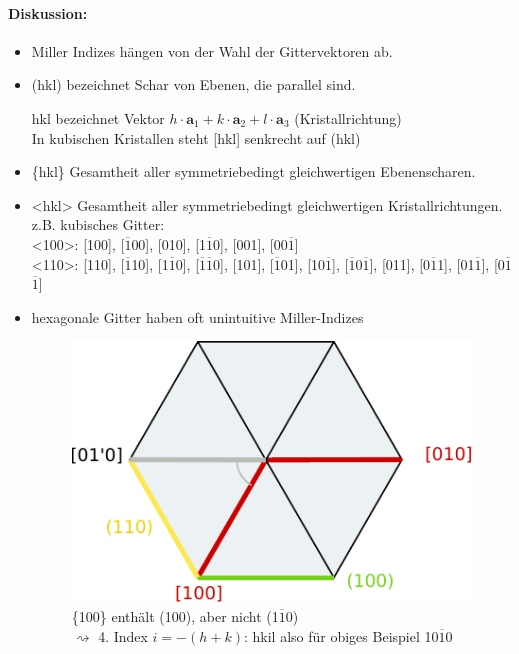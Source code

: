 \begin{itemize}
    \paragraph{Diskussion:}
    \begin{itemize}
        \item Miller Indizes hängen von der Wahl der Gittervektoren ab.
        \item (hkl) bezeichnet Schar von Ebenen, die parallel sind.
        \item [hkl] bezeichnet Vektor $h\cdot \textbf{a}_1 + k \cdot \textbf{a}_2 + l \cdot \textbf{a}_3$ (Kristallrichtung)\\
        In kubischen Kristallen steht [hkl] senkrecht auf (hkl)
        \item \{hkl\} Gesamtheit aller symmetriebedingt gleichwertigen Ebenenscharen.
        \item <hkl> Gesamtheit aller symmetriebedingt gleichwertigen Kristallrichtungen.\\
        z.B. kubisches Gitter:\\
        <100>: [100], [$\overline{1}$00], [010], [1$\overline{1}$0], [001], [00$\overline{1}$]\\
        <110>: [110], [$\overline{1}$10], [1$\overline{1}$0], [$\overline{1}$$\overline{1}$0], [101], [$\overline{1}$01], [10$\overline{1}$], [$\overline{1}$0$\overline{1}$], [011], [0$\overline{1}$1], [01$\overline{1}$], [0$\overline{1}$$\overline{1}$]
        \item hexagonale Gitter haben oft unintuitive Miller-Indizes\\
        \begin{figure}[H]
            \centering
            \includegraphics[]{figures/2_4Hexa.pdf}
            \caption{\{100\} enthält (100), aber nicht (1$\overline{1}$0)\\
            $\rightsquigarrow$ 4. Index $i = -(h+k)$: hkil also für obiges Beispiel {10$\overline{1}$0}}
            \label{}
        \end{figure}
	\end{itemize}
\end{itemize}